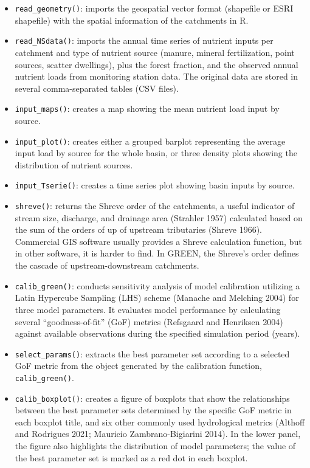 \begin{itemize}
\item
  \texttt{read\_geometry()}: imports the geospatial vector format (shapefile or ESRI shapefile) with the spatial information of the catchments in R.
\item
  \texttt{read\_NSdata()}: imports the annual time series of nutrient inputs per catchment and type of nutrient source (manure, mineral fertilization, point sources, scatter dwellings), plus the forest fraction, and the observed annual nutrient loads from monitoring station data. The original data are stored in several comma-separated tables (CSV files).
\item
  \texttt{input\_maps()}: creates a map showing the mean nutrient load input by source.
\item
  \texttt{input\_plot()}: creates either a grouped barplot representing the average input load by source for the whole basin, or three density plots showing the distribution of nutrient sources.
\item
  \texttt{input\_Tserie()}: creates a time series plot showing basin inputs by source.
\item
  \texttt{shreve()}: returns the Shreve order of the catchments, a useful indicator of stream size, discharge, and drainage area (Strahler 1957) calculated based on the sum of the orders of up of upstream tributaries (Shreve 1966). Commercial GIS software usually provides a Shreve calculation function, but in other software, it is harder to find. In GREEN, the Shreve's order defines the cascade of upstream-downstream catchments.
\item
  \texttt{calib\_green()}: conducts sensitivity analysis of model calibration utilizing a Latin Hypercube Sampling (LHS) scheme (Manache and Melching 2004) for three model parameters. It evaluates model performance by calculating several ``goodness-of-fit'' (GoF) metrics (Refsgaard and Henriksen 2004) against available observations during the specified simulation period (years).
\item
  \texttt{select\_params()}: extracts the best parameter set according to a selected GoF metric from the object generated by the calibration function, \texttt{calib\_green()}.
\item
  \texttt{calib\_boxplot()}: creates a figure of boxplots that show the relationships between the best parameter sets determined by the specific GoF metric in each boxplot title, and six other commonly used hydrological metrics (Althoff and Rodrigues 2021; Mauricio Zambrano-Bigiarini 2014). In the lower panel, the figure also highlights the distribution of model parameters; the value of the best parameter set is marked as a red dot in each boxplot.

\end{itemize}
